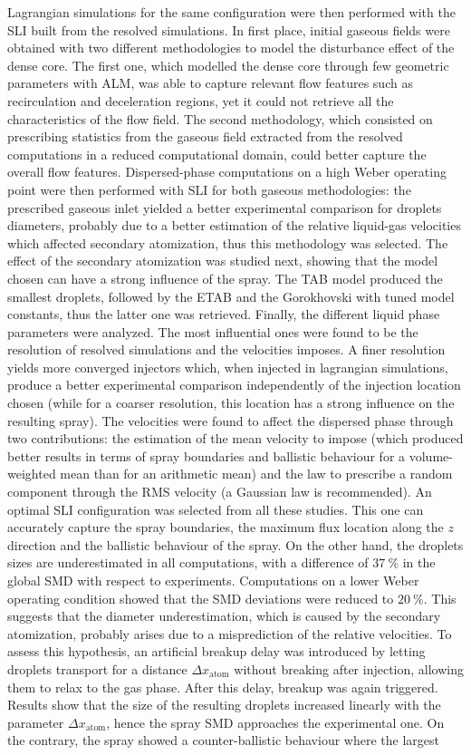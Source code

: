 Lagrangian simulations for the same configuration were then performed with the SLI built from the resolved simulations. In first place, initial gaseous fields were obtained with two different methodologies to model the disturbance effect of the dense core. The first one, which modelled the dense core through few geometric parameters with 
ALM, was able to capture relevant flow features such as recirculation and deceleration regions, yet it could not retrieve all the characteristics of the flow field. The second methodology, which consisted on prescribing statistics from the gaseous field extracted from the resolved computations in a reduced computational domain, could better capture the overall flow features. Dispersed-phase computations on a high Weber operating point were then performed with SLI for both gaseous methodologies: the prescribed gaseous inlet yielded a better experimental comparison for droplets diameters, probably due to a better estimation of the relative liquid-gas velocities which affected secondary atomization, thus this methodology was selected. The effect of the secondary atomization was studied next, showing that the model chosen can have a strong influence of the spray. The TAB model produced the smallest droplets, followed by the ETAB and the Gorokhovski with tuned model constants, thus the latter one was retrieved. Finally, the different liquid phase parameters were analyzed. The most influential ones were found to be the resolution of resolved simulations and the velocities imposes. A finer resolution yields more converged injectors which, when injected in lagrangian simulations, produce a better experimental comparison independently of the injection location chosen (while for a coarser resolution, this location has a strong influence on the resulting spray). The velocities were found to affect the dispersed phase through two contributions: the estimation of the mean velocity to impose (which produced better results in terms of spray boundaries and ballistic behaviour for a volume-weighted mean than for an arithmetic mean) and the law to prescribe a random component through the RMS velocity (a Gaussian law is recommended). An optimal SLI configuration was selected from all these studies. This one can accurately capture the spray boundaries, the maximum flux location along the $z$ direction and the ballistic behaviour of the spray. On the other hand, the droplets sizes are underestimated in all computations, with a difference of $37~\%$ in the global SMD with respect to experiments. Computations on a lower Weber operating condition showed that the SMD deviations were reduced to $20~\%$. This suggests that the diameter underestimation, which is caused by the secondary atomization, probably arises due to a misprediction of the relative velocities. To assess this hypothesis, an artificial breakup delay was introduced by letting droplets transport for a distance $\Delta x_\mathrm{atom}$ without breaking after injection, allowing them to relax to the gas phase. After this delay, breakup was again triggered. Results show that the size of the resulting droplets increased linearly with the parameter $\Delta x_\mathrm{atom}$, hence the spray SMD approaches the experimental one. On the contrary, the spray showed a counter-ballistic behaviour where the largest 